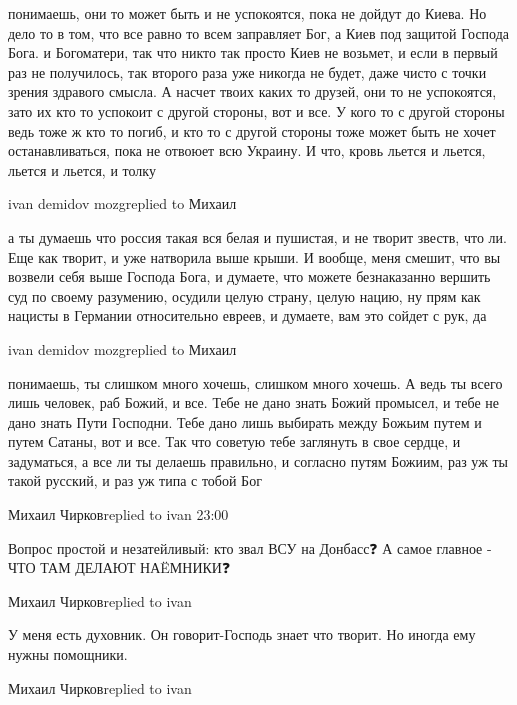  
 
 
 
 

понимаешь, они то может быть и не успокоятся, пока не дойдут до Киева. Но дело
то в том, что все равно то всем заправляет Бог, а Киев под защитой Господа
Бога. и Богоматери, так что никто так просто Киев не возьмет, и если в первый
раз не получилось, так второго раза уже никогда не будет, даже чисто с точки
зрения здравого смысла. А насчет твоих каких то друзей, они то не успокоятся,
зато их кто то успокоит с другой стороны, вот и все. У кого то с другой стороны
ведь тоже ж кто то погиб, и кто то с другой стороны тоже может быть не хочет
останавливаться, пока не отвоюет всю Украину. И что, кровь льется и льется,
льется и льется, и толку

ivan demidov mozgreplied to Михаил

а ты думаешь что россия такая вся белая и пушистая, и не творит звеств, что ли.
Еще как творит, и уже натворила выше крыши. И вообще, меня смешит, что вы
возвели себя выше Господа Бога, и думаете, что можете безнаказанно вершить суд
по своему разумению, осудили целую страну, целую нацию, ну прям как нацисты в
Германии относительно евреев, и думаете, вам это сойдет с рук, да

ivan demidov mozgreplied to Михаил

понимаешь, ты слишком много хочешь, слишком много хочешь. А ведь ты всего лишь
человек, раб Божий, и все. Тебе не дано знать Божий промысел, и тебе не дано
знать Пути Господни. Тебе дано лишь выбирать между Божьим путем и путем Сатаны,
вот и все. Так что советую тебе заглянуть в свое сердце, и задуматься, а все ли
ты делаешь правильно, и согласно путям Божиим, раз уж ты такой русский, и раз
уж типа с тобой Бог

Михаил Чирковreplied to ivan
23:00

Вопрос простой и незатейливый: кто звал ВСУ на Донбасс❓
А самое главное - ЧТО ТАМ ДЕЛАЮТ НАËМНИКИ❓

Михаил Чирковreplied to ivan

У меня есть духовник.
Он говорит-Господь знает что творит.
Но иногда ему нужны помощники.

Михаил Чирковreplied to ivan

